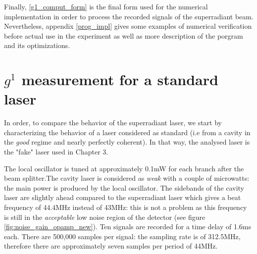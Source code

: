 \documentclass[10pt]{report}
\begin{document}
Finally, \eqref{g1_comput_form} is the final form used for the numerical implementation in order to process the recorded signals of the superradiant beam. Nevertheless, appendix \ref{prog_impl} gives some examples of numerical verification before actual use in the experiment as well as more description of the porgram and its optimizations.

\section{$g^1$ measurement for a standard laser}

In order, to compare the behavior of the superradiant laser, we start by characterizing the behavior of a laser considered as standard (i.e from a cavity in the \textit{good} regime and nearly perfectly coherent). In that way, the analysed laser is the "fake" laser used in Chapter 3.

The local oscillator is tuned at approximately 0.1mW for each branch after the beam splitter.The cavity laser is considered as \textit{weak} with a couple of microwatts: the main power is produced by the local oscillator. The sidebands of the cavity laser are slightly ahead compared to the superradiant laser which gives a beat frequency of 44.4MHz instead of 43MHz: this is not a problem as this frequency is still in the \textit{acceptable} low noise region of the detector (see figure \ref{fig:noise_gain_opamp_new}). Ten signals are recorded for a time delay of 1.6ms each. There are 500,000 samples per signal: the sampling rate is of 312.5MHz, therefore there are approximately seven samples per period of 44MHz.
\end{document}
